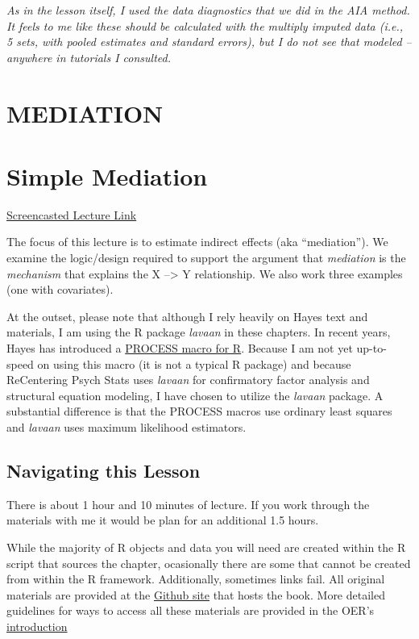 \documentclass[
  11pt,
]{book}
\begin{document}
\emph{As in the lesson itself, I used the data diagnostics that we did in the AIA method. It feels to me like these should be calculated with the multiply imputed data (i.e., 5 sets, with pooled estimates and standard errors), but I do not see that modeled -- anywhere in tutorials I consulted.}

\hypertarget{MED}{%
\chapter*{MEDIATION}\label{MED}}


\hypertarget{SimpleMed}{%
\chapter{Simple Mediation}\label{SimpleMed}}

\href{https://youtube.com/playlist?list=PLtz5cFLQl4KO-j2YBYGwyUl34pIXzNVST\&si=Jp5LJf35y5T-VbFb}{Screencasted Lecture Link}

The focus of this lecture is to estimate indirect effects (aka ``mediation''). We examine the logic/design required to support the argument that \emph{mediation} is the \emph{mechanism} that explains the X --\textgreater{} Y relationship. We also work three examples (one with covariates).

At the outset, please note that although I rely heavily on Hayes \citeyearpar{hayes_introduction_2018} text and materials, I am using the R package \emph{lavaan} in these chapters. In recent years, Hayes has introduced a \href{https://www.processmacro.org/index.html}{PROCESS macro for R}. Because I am not yet up-to-speed on using this macro (it is not a typical R package) and because ReCentering Psych Stats uses \emph{lavaan} for confirmatory factor analysis and structural equation modeling, I have chosen to utilize the \emph{lavaan} package. A substantial difference is that the PROCESS macros use ordinary least squares and \emph{lavaan} uses maximum likelihood estimators.

\hypertarget{navigating-this-lesson-4}{%
\section{Navigating this Lesson}\label{navigating-this-lesson-4}}

There is about 1 hour and 10 minutes of lecture. If you work through the materials with me it would be plan for an additional 1.5 hours.

While the majority of R objects and data you will need are created within the R script that sources the chapter, ocasionally there are some that cannot be created from within the R framework. Additionally, sometimes links fail. All original materials are provided at the \href{https://github.com/lhbikos/ReC_MultivModel}{Github site} that hosts the book. More detailed guidelines for ways to access all these materials are provided in the OER's \protect\hyperlink{ReCintro}{introduction}
\end{document}
